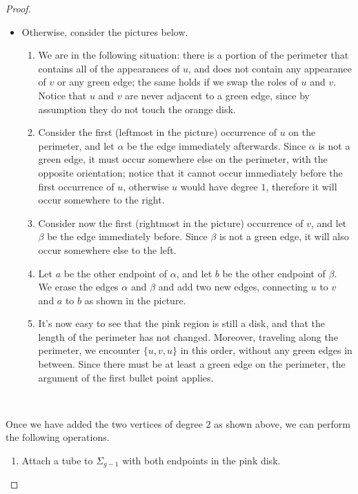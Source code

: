 \documentclass{article}
\begin{document}
\begin{proof}
\begin{manycases}
\begin{itemize}
\item Otherwise, consider the pictures below.
\begin{enumerate}
\item We are in the following situation: there is a portion of the perimeter that contains all of the appearances of $u$, and does not contain any appearance of $v$ or any green edge; the same holds if we swap the roles of $u$ and $v$. Notice that $u$ and $v$ are never adjacent to a green edge, since by assumption they do not touch the orange disk.
\item Consider the first (leftmost in the picture) occurrence of $u$ on the perimeter, and let $\alpha$ be the edge immediately afterwards. Since $\alpha$ is not a green edge, it must occur somewhere else on the perimeter, with the opposite orientation; notice that it cannot occur immediately before the first occurrence of $u$, otherwise $u$ would have degree $1$, therefore it will occur somewhere to the right.
\item Consider now the first (rightmost in the picture) occurrence of $v$, and let $\beta$ be the edge immediately before. Since $\beta$ is not a green edge, it will also occur somewhere else to the left.
\item Let $a$ be the other endpoint of $\alpha$, and let $b$ be the other endpoint of $\beta$. We erase the edges $\alpha$ and $\beta$ and add two new edges, connecting $u$ to $v$ and $a$ to $b$ as shown in the picture.
\item It's now easy to see that the pink region is still a disk, and that the length of the perimeter has not changed. Moreover, traveling along the perimeter, we encounter $\{u,v,u\}$ in this order, without any green edges in between. Since there must be at least a green edge on the perimeter, the argument of the first bullet point applies.
\end{enumerate}
\begin{center}
\newcommand{\pic}[1]{\raisebox{-1.\height}{\texttt{[image: \#1]}}}
\pic{move6-2-2-1}\qquad\pic{move6-2-2-2}\qquad\pic{move6-2-2-3}\\
\bigskip
\pic{move6-2-2-4}\qquad\pic{move6-2-2-5}
\end{center}
\end{itemize}
Once we have added the two vertices of degree 2 as shown above, we can perform the following operations.
\begin{enumerate}
\item Attach a tube to $\Sigma_{g-1}$ with both endpoints in the pink disk.

\end{enumerate}
\end{manycases}
\end{proof}
\end{document}
